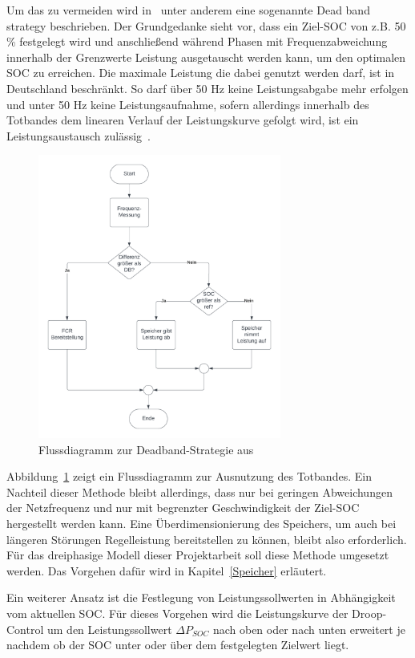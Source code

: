Um das zu vermeiden wird in~\parencite[]{noauthor_soc_nodate} unter anderem eine sogenannte Dead band strategy beschrieben.
Der Grundgedanke sieht vor, dass ein Ziel-SOC von z.B. 50 \% festgelegt wird und anschließend während Phasen mit 
Frequenzabweichung innerhalb der Grenzwerte Leistung ausgetauscht werden kann, um den optimalen SOC zu erreichen.
Die maximale Leistung die dabei genutzt werden darf, ist in Deutschland beschränkt.
So darf über 50 Hz keine Leistungsabgabe mehr erfolgen und unter 50 Hz keine Leistungsaufnahme,
sofern allerdings innerhalb des Totbandes dem linearen Verlauf der Leistungskurve gefolgt wird,
ist ein Leistungsaustausch zulässig~\parencite[]{marchgraber_modellierung_2019}.

\begin{figure}[h!]
    \centering
    \includegraphics[width=8cm]{Abbildungen/DBFlow.png}
    \caption{Flussdiagramm zur Deadband-Strategie aus~\parencite[]{noauthor_soc_nodate}}\label{FlowPCR}
\end{figure}

Abbildung~\ref{FlowPCR} zeigt ein Flussdiagramm zur Ausnutzung des Totbandes.
Ein Nachteil dieser Methode bleibt allerdings, dass nur bei geringen Abweichungen der Netzfrequenz und nur mit begrenzter 
Geschwindigkeit der Ziel-SOC hergestellt werden kann. 
Eine Überdimensionierung des Speichers, um auch bei längeren Störungen Regelleistung bereitstellen zu können, bleibt
also erforderlich.
Für das dreiphasige Modell dieser Projektarbeit soll diese Methode umgesetzt werden. 
Das Vorgehen dafür wird in Kapitel~\ref{Speicher} erläutert.

Ein weiterer Ansatz ist die Festlegung von Leistungssollwerten in Abhängigkeit vom aktuellen SOC.
Für dieses Vorgehen wird die Leistungskurve der Droop-Control um den Leistungssollwert $\Delta P_{SOC}$ nach oben
oder nach unten erweitert je nachdem ob der SOC unter oder über dem festgelegten Zielwert liegt.

